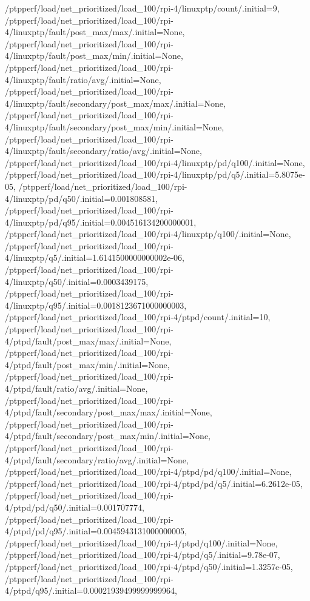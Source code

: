 {    /ptpperf/load/net_prioritized/load_100/rpi-4/linuxptp/count/.initial=9,
    /ptpperf/load/net_prioritized/load_100/rpi-4/linuxptp/fault/post_max/max/.initial=None,
    /ptpperf/load/net_prioritized/load_100/rpi-4/linuxptp/fault/post_max/min/.initial=None,
    /ptpperf/load/net_prioritized/load_100/rpi-4/linuxptp/fault/ratio/avg/.initial=None,
    /ptpperf/load/net_prioritized/load_100/rpi-4/linuxptp/fault/secondary/post_max/max/.initial=None,
    /ptpperf/load/net_prioritized/load_100/rpi-4/linuxptp/fault/secondary/post_max/min/.initial=None,
    /ptpperf/load/net_prioritized/load_100/rpi-4/linuxptp/fault/secondary/ratio/avg/.initial=None,
    /ptpperf/load/net_prioritized/load_100/rpi-4/linuxptp/pd/q100/.initial=None,
    /ptpperf/load/net_prioritized/load_100/rpi-4/linuxptp/pd/q5/.initial=5.8075e-05,
    /ptpperf/load/net_prioritized/load_100/rpi-4/linuxptp/pd/q50/.initial=0.001808581,
    /ptpperf/load/net_prioritized/load_100/rpi-4/linuxptp/pd/q95/.initial=0.004516134200000001,
    /ptpperf/load/net_prioritized/load_100/rpi-4/linuxptp/q100/.initial=None,
    /ptpperf/load/net_prioritized/load_100/rpi-4/linuxptp/q5/.initial=1.6141500000000002e-06,
    /ptpperf/load/net_prioritized/load_100/rpi-4/linuxptp/q50/.initial=0.0003439175,
    /ptpperf/load/net_prioritized/load_100/rpi-4/linuxptp/q95/.initial=0.0018123671000000003,
    /ptpperf/load/net_prioritized/load_100/rpi-4/ptpd/count/.initial=10,
    /ptpperf/load/net_prioritized/load_100/rpi-4/ptpd/fault/post_max/max/.initial=None,
    /ptpperf/load/net_prioritized/load_100/rpi-4/ptpd/fault/post_max/min/.initial=None,
    /ptpperf/load/net_prioritized/load_100/rpi-4/ptpd/fault/ratio/avg/.initial=None,
    /ptpperf/load/net_prioritized/load_100/rpi-4/ptpd/fault/secondary/post_max/max/.initial=None,
    /ptpperf/load/net_prioritized/load_100/rpi-4/ptpd/fault/secondary/post_max/min/.initial=None,
    /ptpperf/load/net_prioritized/load_100/rpi-4/ptpd/fault/secondary/ratio/avg/.initial=None,
    /ptpperf/load/net_prioritized/load_100/rpi-4/ptpd/pd/q100/.initial=None,
    /ptpperf/load/net_prioritized/load_100/rpi-4/ptpd/pd/q5/.initial=6.2612e-05,
    /ptpperf/load/net_prioritized/load_100/rpi-4/ptpd/pd/q50/.initial=0.001707774,
    /ptpperf/load/net_prioritized/load_100/rpi-4/ptpd/pd/q95/.initial=0.0045943131000000005,
    /ptpperf/load/net_prioritized/load_100/rpi-4/ptpd/q100/.initial=None,
    /ptpperf/load/net_prioritized/load_100/rpi-4/ptpd/q5/.initial=9.78e-07,
    /ptpperf/load/net_prioritized/load_100/rpi-4/ptpd/q50/.initial=1.3257e-05,
    /ptpperf/load/net_prioritized/load_100/rpi-4/ptpd/q95/.initial=0.00021939499999999964,
}
